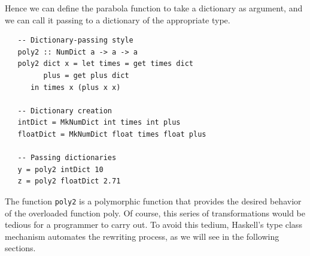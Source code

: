 Hence we can define the parabola function to take a dictionary as argument, and we can call it passing to a dictionary of the appropriate type.
\begin{lstlisting}
   -- Dictionary-passing style
   poly2 :: NumDict a -> a -> a
   poly2 dict x = let times = get times dict
         plus = get plus dict
      in times x (plus x x)

   -- Dictionary creation
   intDict = MkNumDict int times int plus
   floatDict = MkNumDict float times float plus

   -- Passing dictionaries
   y = poly2 intDict 10
   z = poly2 floatDict 2.71
\end{lstlisting}
The function \lstinline|poly2| is a polymorphic function that provides the desired behavior
of the overloaded function poly.
Of course, this series of transformations would be tedious for a programmer
to carry out. To avoid this tedium, Haskell’s type class mechanism automates the
rewriting process, as we will see in the following sections.


